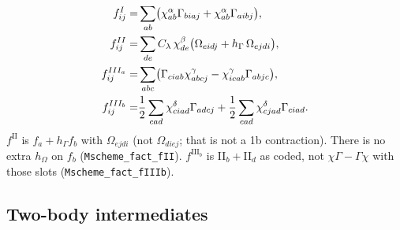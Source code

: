 \documentclass[enabledeprecatedfontcommands]{scrartcl}
\newcommand{\codename}[1]{\texttt{#1}}
\newcommand{\MyRomanNum}[1]{%
  \ifcase#1\or I\or II\or III\or IV\or V\or VI\or VII\or VIII\or IX\or X\else #1\fi}
\begin{document}
\begin{subequations}\label{eq:fact1b}
\begin{align}
 f^{\MyRomanNum{1}}_{ij}
  =&\sum_{ab}\bigl(
    \chi^{\alpha}_{ab}\Gamma_{biaj}
   +\chi^{\alpha}_{ab}\Gamma_{aibj}
  \bigr),\\
 f^{\MyRomanNum{2}}_{ij}
  =&\sum_{de}C_\lambda\,\chi^{\beta}_{de}
    \bigl(\Omega_{eidj}+h_\Gamma\,\Omega_{ejdi}\bigr),
  \label{eq:fII}\\
 f^{\MyRomanNum{3}_a}_{ij}
  =&\sum_{abc}\bigl(
    \Gamma_{ciab}\chi^{\gamma}_{abcj}
   -\chi^{\gamma}_{icab}\Gamma_{abjc}
  \bigr),
  \label{eq:fIIIa}\\
 f^{\MyRomanNum{3}_b}_{ij}
  =&\frac12\sum_{cad}
    \chi^{\delta}_{ciad}\Gamma_{adcj}
   +\frac12\sum_{cad}
    \chi^{\delta}_{cjad}\Gamma_{ciad}.
  \label{eq:fIIIb}
\end{align}
\end{subequations}
$f^{\mathrm{II}}$ is $f_a+h_\Gamma f_b$ with $\Omega_{ejdi}$ (not
$\Omega_{diej}$; that is not a 1b contraction). There is no extra $h_\Omega$
on $f_b$ (\codename{Mscheme\_fact\_fII}).
$f^{\mathrm{III}_b}$ is II$_b+$II$_d$ as coded, not
$\chi\Gamma-\Gamma\chi$ with those slots
(\codename{Mscheme\_fact\_fIIIb}).

\subsection{Two-body intermediates}
\label{sec:chi2b}
\end{document}

